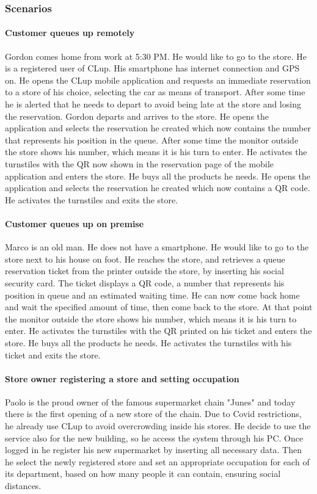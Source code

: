 \subsubsection{Scenarios} %
\paragraph{Customer queues up remotely}
Gordon comes home from work at 5:30 PM. He would like to go to the store. He is a registered user of CLup. His smartphone has internet connection and GPS on. He opens the CLup mobile application and requests an immediate reservation to a store of his choice, selecting the car as means of transport. After some time he is alerted that he needs to depart to avoid being late at the store and losing the reservation. Gordon departs and arrives to the store. He opens the application and selects the reservation he created which now contains the number that represents his position in the queue. After some time the monitor outside the store shows his number, which means it is his turn to enter. He activates the turnstiles with the QR now shown in the reservation page of the mobile application and enters the store. He buys all the products he needs. He opens the application and selects the reservation he created which now contains a QR code. He activates the turnstiles and exits the store.
\paragraph{Customer queues up on premise}
Marco is an old man. He does not have a smartphone. He would like to go to the store next to his house on foot. He reaches the store, and retrieves a queue reservation ticket from the printer outside the store, by inserting his social security card. The ticket displays a QR code, a number that represents his position in queue and an estimated waiting time. He can now come back home and wait the specified amount of time, then come back to the store. At that point the monitor outside the store shows his number, which means it is his turn to enter. He activates the turnstiles with the QR printed on his ticket and enters the store. He buys all the products he needs. He activates the turnstiles with his ticket and exits the store.
\paragraph{Store owner registering a store and setting occupation}
Paolo is the proud owner of the famous supermarket chain "Junes" and today there is the first opening of a new store of the chain. Due to Covid restrictions, he already use CLup to avoid overcrowding inside his stores. He decide to use the service also for the new building, so he access the system through his PC. Once logged in he register his new supermarket by inserting all necessary data. Then he select the newly registered store and set an appropriate occupation for each of its department, based on how many people it can contain, ensuring social distances.

